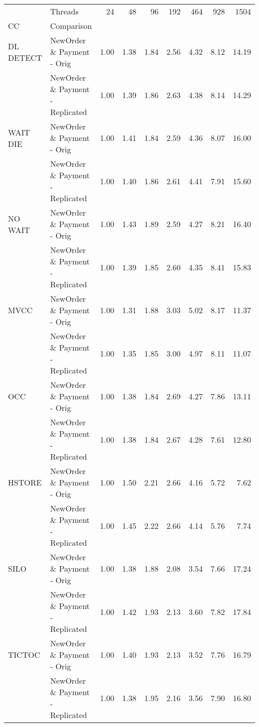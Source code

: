 \begin{tabular}{llrrrrrrr}
\toprule
       & Threads &  24   &  48   &  96   &  192  &  464  &  928  &  1504 \\
CC & Comparison &       &       &       &       &       &       &       \\
\midrule
DL DETECT & NewOrder \& Payment - Orig &  1.00 &  1.38 &  1.84 &  2.56 &  4.32 &  8.12 & 14.19 \\
       & NewOrder \& Payment - Replicated &  1.00 &  1.39 &  1.86 &  2.63 &  4.38 &  8.14 & 14.29 \\
WAIT DIE & NewOrder \& Payment - Orig &  1.00 &  1.41 &  1.84 &  2.59 &  4.36 &  8.07 & 16.00 \\
       & NewOrder \& Payment - Replicated &  1.00 &  1.40 &  1.86 &  2.61 &  4.41 &  7.91 & 15.60 \\
NO WAIT & NewOrder \& Payment - Orig &  1.00 &  1.43 &  1.89 &  2.59 &  4.27 &  8.21 & 16.40 \\
       & NewOrder \& Payment - Replicated &  1.00 &  1.39 &  1.85 &  2.60 &  4.35 &  8.41 & 15.83 \\
MVCC & NewOrder \& Payment - Orig &  1.00 &  1.31 &  1.88 &  3.03 &  5.02 &  8.17 & 11.37 \\
       & NewOrder \& Payment - Replicated &  1.00 &  1.35 &  1.85 &  3.00 &  4.97 &  8.11 & 11.07 \\
OCC & NewOrder \& Payment - Orig &  1.00 &  1.38 &  1.84 &  2.69 &  4.27 &  7.86 & 13.11 \\
       & NewOrder \& Payment - Replicated &  1.00 &  1.38 &  1.84 &  2.67 &  4.28 &  7.61 & 12.80 \\
HSTORE & NewOrder \& Payment - Orig &  1.00 &  1.50 &  2.21 &  2.66 &  4.16 &  5.72 &  7.62 \\
       & NewOrder \& Payment - Replicated &  1.00 &  1.45 &  2.22 &  2.66 &  4.14 &  5.76 &  7.74 \\
SILO & NewOrder \& Payment - Orig &  1.00 &  1.38 &  1.88 &  2.08 &  3.54 &  7.66 & 17.24 \\
       & NewOrder \& Payment - Replicated &  1.00 &  1.42 &  1.93 &  2.13 &  3.60 &  7.82 & 17.84 \\
TICTOC & NewOrder \& Payment - Orig &  1.00 &  1.40 &  1.93 &  2.13 &  3.52 &  7.76 & 16.79 \\
       & NewOrder \& Payment - Replicated &  1.00 &  1.38 &  1.95 &  2.16 &  3.56 &  7.90 & 16.80 \\
\bottomrule
\end{tabular}
